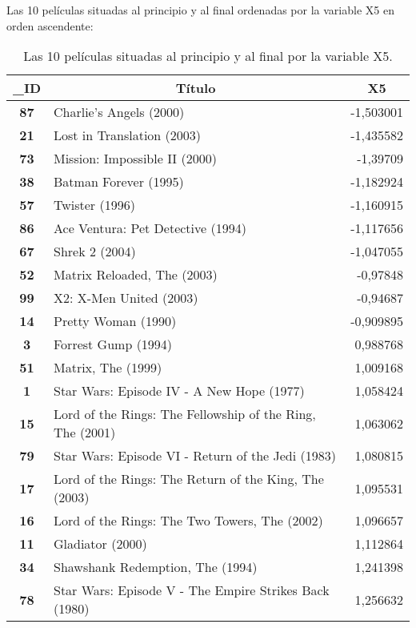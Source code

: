 \documentclass{uimppracticas}
\begin{document}
Las 10 películas situadas al principio y al final ordenadas por la variable X5 en orden ascendente:

\begin{table}[h]
	\centering
	\begin{tabular}{|c|l|r|}
		\hline
		\textbf{\_ID} & \multicolumn{1}{c|}{\textbf{Título}} & \multicolumn{1}{c|}{\textbf{X5}} \\ \hline
		\textbf{87} & Charlie's Angels (2000)       & -1,503001 \\ \hline
		\textbf{21} & Lost in Translation (2003)    & -1,435582 \\ \hline
		\textbf{73} & Mission: Impossible II (2000) & -1,39709  \\ \hline
		\textbf{38} & Batman Forever (1995)         & -1,182924 \\ \hline
		\textbf{57} & Twister (1996)                & -1,160915 \\ \hline
		\textbf{86}   & Ace Ventura: Pet Detective (1994)    & -1,117656                        \\ \hline
		\textbf{67} & Shrek 2 (2004)                & -1,047055 \\ \hline
		\textbf{52} & Matrix Reloaded, The (2003)   & -0,97848  \\ \hline
		\textbf{99} & X2: X-Men United (2003)       & -0,94687  \\ \hline
		\textbf{14} & Pretty Woman (1990)           & -0,909895 \\ \hline
		\hline
		\textbf{3}  & Forrest Gump (1994)                                   & 0,988768 \\ \hline
		\textbf{51} & Matrix, The (1999)                                    & 1,009168 \\ \hline
		\textbf{1}  & Star Wars: Episode IV - A New Hope (1977)             & 1,058424 \\ \hline
		\textbf{15}   & Lord of the Rings: The Fellowship of the Ring, The (2001) & 1,063062                         \\ \hline
		\textbf{79} & Star Wars: Episode VI - Return of the Jedi (1983)     & 1,080815 \\ \hline
		\textbf{17} & Lord of the Rings: The Return of the King, The (2003) & 1,095531 \\ \hline
		\textbf{16} & Lord of the Rings: The Two Towers, The (2002)         & 1,096657 \\ \hline
		\textbf{11} & Gladiator (2000)                                      & 1,112864 \\ \hline
		\textbf{34} & Shawshank Redemption, The (1994)                      & 1,241398 \\ \hline
		\textbf{78} & Star Wars: Episode V - The Empire Strikes Back (1980) & 1,256632 \\ \hline
	\end{tabular}
	\caption{Las 10 películas situadas al principio y al final por la variable X5.}
	\label{X5_principio}
\end{table}
\end{document}
